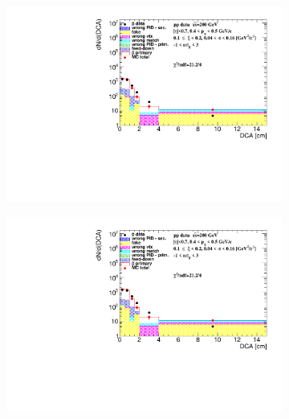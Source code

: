 \begin{figure}[h!]
\begin{subfigure}{.45\textwidth}
	\end{subfigure}
	\begin{subfigure}{.45\textwidth}
		\includegraphics[width=\linewidth, page=8]{chapters/chrgSTAR/img/DCAproton/background_p_bar_2.pdf}
	\end{subfigure}
	\begin{subfigure}{.45\textwidth}
		\includegraphics[width=\linewidth, page=11]{chapters/chrgSTAR/img/DCAproton/background_p_bar_2.pdf}
	\end{subfigure}
	\begin{subfigure}{.45\textwidth}

\end{subfigure}
\end{figure}
